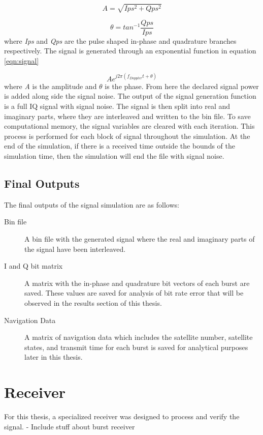 \documentclass[12pt]{report}
\begin{document}
\begin{equation}
    A = \sqrt{Ips^2 + Qps^2}
    \label{eqn:amplitude}
\end{equation}

\begin{equation}
    \theta = tan^{-1} \frac{Qps}{Ips}
    \label{eqn:phase}
\end{equation}
where \textit{Ips} and \textit{Qps} are the pulse shaped in-phase and quadrature branches respectively. The signal is generated through an exponential function in equation \ref{eqn:signal}

\begin{equation}
    A e^{j2\pi (f_{Doppler}t + \theta)}
    \label{eqn:signal}
\end{equation}
where \textit{A} is the amplitude and $\theta$ is the phase. From here the declared signal power is added along side the signal noise. The output of the signal generation function is a full IQ signal with signal noise. The signal is then split into real and imaginary parts, where they are interleaved and written to the bin file. To save computational memory, the signal variables are cleared with each iteration. This process is performed for each block of signal throughout the simulation. At the end of the simulation, if there is a received time outside the bounds of the simulation time, then the simulation will end the file with signal noise.

\subsection{Final Outputs}
The final outputs of the signal simulation are as follows:
\begin{description}
    \item[Bin file] A bin file with the generated signal where the real and imaginary parts of the signal have been interleaved.
    \item[I and Q bit matrix] A matrix with the in-phase and quadrature bit vectors of each burst are saved. These values are saved for analysis of bit rate error that will be observed in the results section of this thesis.
    \item[Navigation Data] A matrix of navigation data which includes the satellite number, satellite states, and transmit time for each burst is saved for analytical purposes later in this thesis.
\end{description}

\section{Receiver}
For this thesis, a specialized receiver was designed to process and verify the signal. 
- Include stuff about burst receiver
\end{document}
